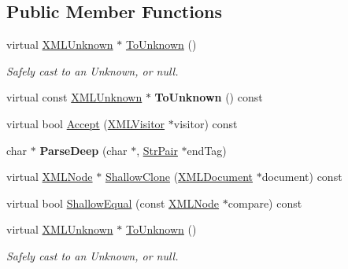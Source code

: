\subsection*{Public Member Functions}
\begin{DoxyCompactItemize}
\item 
\mbox{\label{classtinyxml2_1_1XMLUnknown_af4374856421921cad578c8affae872b6}} 
virtual \hyperlink{classtinyxml2_1_1XMLUnknown}{X\+M\+L\+Unknown} $\ast$ \hyperlink{classtinyxml2_1_1XMLUnknown_af4374856421921cad578c8affae872b6}{To\+Unknown} ()
\begin{DoxyCompactList}\small\item\em Safely cast to an Unknown, or null. \end{DoxyCompactList}\item 
\mbox{\label{classtinyxml2_1_1XMLUnknown_a61b342b4f295cded1dc2f4402e97f07e}} 
virtual const \hyperlink{classtinyxml2_1_1XMLUnknown}{X\+M\+L\+Unknown} $\ast$ {\bfseries To\+Unknown} () const
\item 
virtual bool \hyperlink{classtinyxml2_1_1XMLUnknown_a8a06b8c82117ca969a432e17a46830fc}{Accept} (\hyperlink{classtinyxml2_1_1XMLVisitor}{X\+M\+L\+Visitor} $\ast$visitor) const
\item 
\mbox{\label{classtinyxml2_1_1XMLUnknown_a0e4f3509dee42a4d45a7f0002be568cc}} 
char $\ast$ {\bfseries Parse\+Deep} (char $\ast$, \hyperlink{classtinyxml2_1_1StrPair}{Str\+Pair} $\ast$end\+Tag)
\item 
virtual \hyperlink{classtinyxml2_1_1XMLNode}{X\+M\+L\+Node} $\ast$ \hyperlink{classtinyxml2_1_1XMLUnknown_ab73b48b819aa4b2ef3815dc2d7d20d5f}{Shallow\+Clone} (\hyperlink{classtinyxml2_1_1XMLDocument}{X\+M\+L\+Document} $\ast$document) const
\item 
virtual bool \hyperlink{classtinyxml2_1_1XMLUnknown_ac46767cd721d666e690a6231dfb618d1}{Shallow\+Equal} (const \hyperlink{classtinyxml2_1_1XMLNode}{X\+M\+L\+Node} $\ast$compare) const
\item 
\mbox{\label{classtinyxml2_1_1XMLUnknown_af4374856421921cad578c8affae872b6}} 
virtual \hyperlink{classtinyxml2_1_1XMLUnknown}{X\+M\+L\+Unknown} $\ast$ \hyperlink{classtinyxml2_1_1XMLUnknown_af4374856421921cad578c8affae872b6}{To\+Unknown} ()
\begin{DoxyCompactList}\small\item\em Safely cast to an Unknown, or null. \end{DoxyCompactList}\item 

\end{DoxyCompactItemize}
